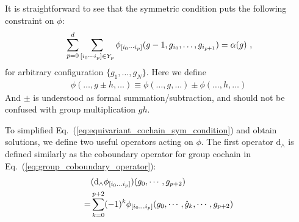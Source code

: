 \documentclass[%
  reprint,
  amsmath,amssymb,
  aps,pra,
]{revtex4-1}
\newcommand{\dd}{\mathrm{d}} %
\begin{document}
It is straightforward to see that the symmetric condition puts the following constraint on $\phi$:
\begin{align}
  &\sum_{p=0}^d\sum_{[i_0\cdots i_{p}]\in Y_p}\phi_{[i_0\cdots i_{p}]}(g-1,g_{i_0},\dots,g_{i_{p+1}})=\alpha(g)~,\notag\\ 
  \label{eq:equivariant_cochain_sym_condition}
\end{align}
for arbitrary configuration $\{g_1,\ldots,g_N\}$.
Here we define
\begin{align}
  \phi(\ldots,g\pm h,\ldots)\equiv \phi(\ldots,g,\ldots)\pm \phi(\ldots,h,\ldots)
\end{align}
And $\pm$ is understood as formal summation/subtraction, and should not be confused with group multiplication $gh$.


To simplified Eq.~(\ref{eq:equivariant_cochain_sym_condition}) and obtain solutions, we define two useful operators acting on $\phi$.
The first operator $\dd_\wedge$ is defined similarly as the coboundary operator for group cochain in Eq.~(\ref{eq:group_coboundary_operator}):
\begin{align}
  &(\dd_\wedge\phi_{[i_0\ldots i_{p}]})(g_0,\cdots,g_{p+2})\notag\\
  =&\sum_{k=0}^{p+2}(-1)^k\phi_{[i_0\ldots i_{p}]}(g_0,\cdots,\hat{g}_k,\cdots,g_{p+2})
\end{align}
\end{document}
